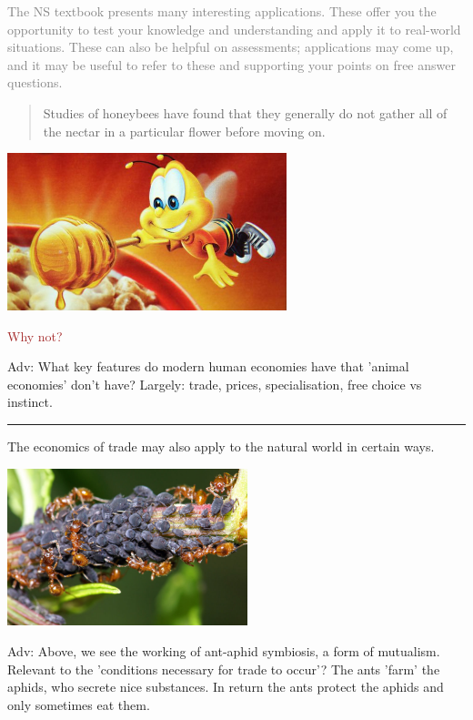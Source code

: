 \documentclass[]{article}
\begin{document}
\textcolor{gray}{The NS textbook presents many interesting applications. These offer you the opportunity to test your knowledge and understanding and apply it to real-world situations. These can also be helpful on assessments; applications may come up, and it may be useful to refer to these and supporting your points on free answer questions.}

\begin{quote}
Studies of honeybees have found that they generally do not gather all of the nectar in a particular flower before moving on.
\end{quote}

\includegraphics[height=1.8in]{picsfigs/buzbee.jpg}

\textcolor{Brown}{Why not?}

\textcolor{RawSienna}{Adv: What key features do modern human economies have that 'animal economies' don't have? Largely: trade, prices, specialisation, free choice vs instinct.}

\begin{center}\rule{0.5\linewidth}{\linethickness}\end{center}

The economics of trade may also apply to the natural world in certain ways.

\includegraphics[height=1.8in]{picsfigs/antaphid.jpg}

\textcolor{RawSienna}{Adv: Above, we see the working of ant-aphid symbiosis, a form of mutualism. Relevant to the 'conditions necessary for trade to occur'? The ants 'farm' the aphids, who secrete nice substances. In return the ants protect the aphids and only sometimes eat them.}
\end{document}
